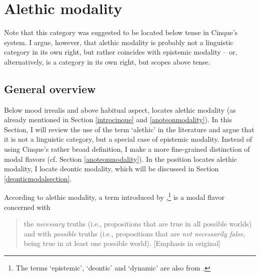 
\section{Alethic modality}\label{alethicmodal}
Note that this category was suggested to be located below tense in Cinque's system. I argue, however, that alethic modality is probably not a linguistic category in its own right, but rather coincides with epistemic modality -- or, alternatively, is a category in its own right, but scopes above tense. 

\subsection{General overview}
Below mood irrealis and above habitual aspect, \citet{cinque1999adverbs} locates alethic modality (as already mentioned in Section \ref{introcinque} and \ref{anoteonmodality}). In this Section, I will review the use of the term `alethic' in the literature and argue that it is not a linguistic category, but a special case of epistemic modality. Instead of using Cinque's rather broad definition, I make a more fine-grained distinction of modal flavors (cf. Section \ref{anoteonmodality}). In the position \citet{cinque1999adverbs} locates alethic modality, I locate deontic modality, which will be discussed in Section \ref{deonticmodalsection}.

According to \citet[78]{cinque1999adverbs} alethic modality, a term introduced by \citet{von1951essay},\footnote{ The terms `epistemic', `deontic' and `dynamic' are also from \citet{von1951essay}.} is a modal flavor concerned with

\begin{quote}
the \textit{necessary} truths (i.e., propositions that are true in all possible worlds) and with \textit{possible} truths (i.e., propositions that are \textit{not necessarily false}, being true in at least one possible world). $[$Emphasis in original$]$ %
\end{quote}

